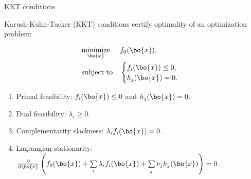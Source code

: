 \documentclass{beamer}
\begin{document}
\begin{frame}{KKT conditions}
	\begin{flushleft}
		
		Karush-Kuhn-Tucker (KKT) conditions certify optimality of an optimization problem:
		
		\begin{equation}
			\begin{aligned}
				& \underset{\bo{x}}{\text{minimize}}
				& & f_0(\bo{x}), \\
				& \text{subject to}
				& & \begin{cases}
					f_i(\bo{x}) \leq 0, \\
					h_j(\bo{x}) = 0.
				\end{cases}
			\end{aligned}
		\end{equation}
		
		\begin{enumerate}
			\item Primal feasibility: $f_i(\bo{x}) \leq 0$ and $h_j(\bo{x}) = 0$.
			
			\item Dual feasibility: $\lambda_i \geq 0$.
			
			\item Complementarity slackness: $\lambda_i f_i(\bo{x}) = 0$.
			
			\item Lagrangian stationarity: $\frac{\partial}{\partial \bo{x}} 
			\left ( f_0(\bo{x}) + 
			\sum\limits_i \lambda_i f_i(\bo{x}) +
			\sum\limits_j \nu_j h_j(\bo{x}) \right ) = 0$.
		\end{enumerate}
		
	\end{flushleft}
\end{frame}
\end{document}
